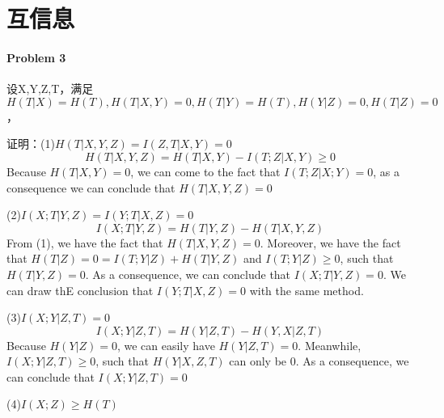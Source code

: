 \documentclass[a4paper, 12pt]{article}
\begin{document}
    \section{互信息}
    \paragraph{Problem 3} 设X,Y,Z,T，满足$H(T|X)=H(T),H(T|X,Y)=0,H(T|Y)=H(T),H(Y|Z)=0,H(T|Z)=0$，
    
    证明：(1)$H(T|X,Y,Z)=I(Z,T|X,Y)=0$
    \[H(T|X,Y,Z)=H(T|X,Y)-I(T;Z|X,Y)\ge 0\]
    Because $H(T|X,Y)=0$, we can come to the fact that $I(T;Z|X;Y)=0$, as a consequence we can conclude that $H(T|X,Y,Z)=0$

    (2)$I(X;T|Y,Z)=I(Y;T|X,Z)=0$
    \[I(X;T|Y,Z)=H(T|Y,Z)-H(T|X,Y,Z)\]
    From (1), we have the fact that $H(T|X,Y,Z)=0$. Moreover, we have the fact that 
    $H(T|Z)=0=I(T;Y|Z)+H(T|Y,Z)$ and $I(T;Y|Z) \ge 0$, such that $H(T|Y,Z)=0$. As a consequence,
    we can conclude that $I(X;T|Y,Z)=0$. We can draw thE conclusion that $I(Y;T|X,Z)=0$ with 
    the same method.

    (3)$I(X;Y|Z,T)=0$
    \[I(X;Y|Z,T)=H(Y|Z,T)-H(Y,X|Z,T)\]
    Because $H(Y|Z)=0$, we can easily have $H(Y|Z,T)=0$. Meanwhile, $I(X;Y|Z,T)\ge 0$,
    such that $H(Y|X,Z,T)$ can only be 0. As a consequence, we can conclude that $I(X;Y|Z,T)=0$

    (4)$I(X;Z)\ge H(T)$
\end{document}
